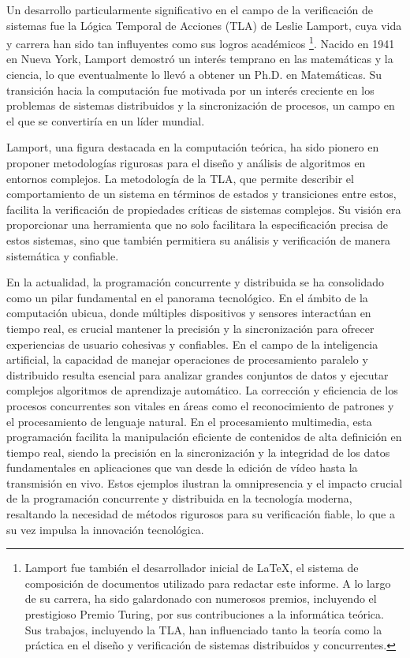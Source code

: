 Un desarrollo particularmente significativo en el campo de la verificación de sistemas fue la Lógica Temporal de Acciones (TLA) de Leslie Lamport, cuya vida y carrera han sido tan influyentes como sus logros académicos \footnote{Lamport fue también el desarrollador inicial de \LaTeX, el sistema de composición de documentos utilizado para redactar este informe. A lo largo de su carrera, ha sido galardonado con numerosos premios, incluyendo el prestigioso Premio Turing, por sus contribuciones a la informática teórica. Sus trabajos, incluyendo la TLA, han influenciado tanto la teoría como la práctica en el diseño y verificación de sistemas distribuidos y concurrentes.}. Nacido en 1941 en Nueva York, Lamport demostró un interés temprano en las matemáticas y la ciencia, lo que eventualmente lo llevó a obtener un Ph.D. en Matemáticas. Su transición hacia la computación fue motivada por un interés creciente en los problemas de sistemas distribuidos y la sincronización de procesos, un campo en el que se convertiría en un líder mundial.


Lamport, una figura destacada en la computación teórica, ha sido pionero en proponer metodologías rigurosas para el diseño y análisis de algoritmos en entornos complejos. La metodología de la TLA, que permite describir el comportamiento de un sistema en términos de estados y transiciones entre estos, facilita la verificación de propiedades críticas de sistemas complejos. Su visión era proporcionar una herramienta que no solo facilitara la especificación precisa de estos sistemas, sino que también permitiera su análisis y verificación de manera sistemática y confiable.


En la actualidad, la programación concurrente y distribuida se ha consolidado como un pilar fundamental en el panorama tecnológico. En el ámbito de la computación ubicua, donde múltiples dispositivos y sensores interactúan en tiempo real, es crucial mantener la precisión y la sincronización para ofrecer experiencias de usuario cohesivas y confiables. En el campo de la inteligencia artificial, la capacidad de manejar operaciones de procesamiento paralelo y distribuido resulta esencial para analizar grandes conjuntos de datos y ejecutar complejos algoritmos de aprendizaje automático. La corrección y eficiencia de los procesos concurrentes son vitales en áreas como el reconocimiento de patrones y el procesamiento de lenguaje natural. En el procesamiento multimedia, esta programación facilita la manipulación eficiente de contenidos de alta definición en tiempo real, siendo la precisión en la sincronización y la integridad de los datos fundamentales en aplicaciones que van desde la edición de vídeo hasta la transmisión en vivo. Estos ejemplos ilustran la omnipresencia y el impacto crucial de la programación concurrente y distribuida en la tecnología moderna, resaltando la necesidad de métodos rigurosos para su verificación fiable, lo que a su vez impulsa la innovación tecnológica.

